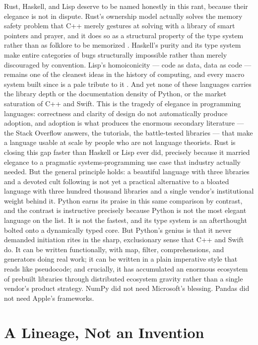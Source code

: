 \documentclass[11pt]{article}
\begin{document}
Rust, Haskell, and Lisp deserve to be named honestly in this rant, because their elegance is not in dispute. Rust's ownership model actually solves the memory safety problem that C++ merely gestures at solving with a library of smart pointers and prayer, and it does so as a structural property of the type system rather than as folklore to be memorized \cite{jung2018}. Haskell's purity and its type system make entire categories of bugs structurally impossible rather than merely discouraged by convention. Lisp's homoiconicity --- code as data, data as code --- remains one of the cleanest ideas in the history of computing, and every macro system built since is a pale tribute to it \cite{mccarthy1960}. And yet none of these languages carries the library depth or the documentation density of Python, or the market saturation of C++ and Swift. This is the tragedy of elegance in programming languages: correctness and clarity of design do not automatically produce adoption, and adoption is what produces the enormous secondary literature --- the Stack Overflow answers, the tutorials, the battle-tested libraries --- that make a language usable at scale by people who are not language theorists. Rust is closing this gap faster than Haskell or Lisp ever did, precisely because it married elegance to a pragmatic systems-programming use case that industry actually needed. But the general principle holds: a beautiful language with three libraries and a devoted cult following is not yet a practical alternative to a bloated language with three hundred thousand libraries and a single vendor's institutional weight behind it. Python earns its praise in this same comparison by contrast, and the contrast is instructive precisely because Python is not the most elegant language on the list. It is not the fastest, and its type system is an afterthought bolted onto a dynamically typed core. But Python's genius is that it never demanded initiation rites in the sharp, exclusionary sense that C++ and Swift do. It can be written functionally, with map, filter, comprehensions, and generators doing real work; it can be written in a plain imperative style that reads like pseudocode; and crucially, it has accumulated an enormous ecosystem of prebuilt libraries through distributed ecosystem gravity rather than a single vendor's product strategy. NumPy did not need Microsoft's blessing. Pandas did not need Apple's frameworks.

\section{A Lineage, Not an Invention}
\end{document}
